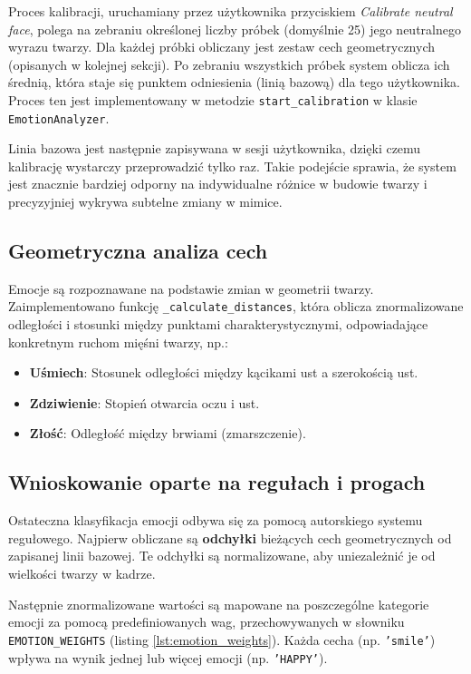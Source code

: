 Proces kalibracji, uruchamiany przez użytkownika przyciskiem \textit{Calibrate neutral face}, polega na zebraniu określonej liczby próbek (domyślnie 25) jego neutralnego wyrazu twarzy. Dla każdej próbki obliczany jest zestaw cech geometrycznych (opisanych w kolejnej sekcji). Po zebraniu wszystkich próbek system oblicza ich średnią, która staje się punktem odniesienia (linią bazową) dla tego użytkownika. Proces ten jest implementowany w metodzie \texttt{start\_calibration} w klasie \texttt{EmotionAnalyzer}.

Linia bazowa jest następnie zapisywana w sesji użytkownika, dzięki czemu kalibrację wystarczy przeprowadzić tylko raz. Takie podejście sprawia, że system jest znacznie bardziej odporny na indywidualne różnice w budowie twarzy i precyzyjniej wykrywa subtelne zmiany w mimice.

\subsection{Geometryczna analiza cech}
Emocje są rozpoznawane na podstawie zmian w geometrii twarzy. Zaimplementowano funkcję \texttt{\_calculate\_distances}, która oblicza znormalizowane odległości i stosunki między punktami charakterystycznymi, odpowiadające konkretnym ruchom mięśni twarzy, np.:
\begin{itemize}
    \item \textbf{Uśmiech}: Stosunek odległości między kącikami ust a szerokością ust.
    \item \textbf{Zdziwienie}: Stopień otwarcia oczu i ust.
    \item \textbf{Złość}: Odległość między brwiami (zmarszczenie).
\end{itemize}

\subsection{Wnioskowanie oparte na regułach i progach}
Ostateczna klasyfikacja emocji odbywa się za pomocą autorskiego systemu regułowego. Najpierw obliczane są \textbf{odchyłki} bieżących cech geometrycznych od zapisanej linii bazowej. Te odchyłki są normalizowane, aby uniezależnić je od wielkości twarzy w kadrze.

Następnie znormalizowane wartości są mapowane na poszczególne kategorie emocji za pomocą predefiniowanych wag, przechowywanych w słowniku \texttt{EMOTION\_WEIGHTS} (listing \ref{lst:emotion_weights}). Każda cecha (np. \texttt{'smile'}) wpływa na wynik jednej lub więcej emocji (np. \texttt{'HAPPY'}).

